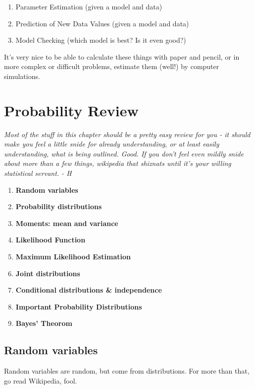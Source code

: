 \documentclass[12pt]{book}
\begin{document}
\begin{enumerate}
\item Parameter Estimation (given a model and data)
\item Prediction of New Data Values (given a model and data)
\item Model Checking (which model is best? Is it even good?)
\end{enumerate}
It's very nice to be able to calculate these things with paper and pencil, or in more complex or difficult problems, estimate them (well!) by computer simulations.






\chapter{Probability Review}

\begin{center}
\textit{Most of the stuff in this chapter should be a pretty easy review for you - it should make you feel a little snide for already understanding, or at least easily understanding, what is being outlined. Good. If you don't feel even mildly snide about more than a few things, wikipedia that shiznats until it's your willing statistical servant. - H }
\end{center}

\vspace{8 mm}

\begin{enumerate}
\item \textbf{Random variables}
\item \textbf{Probability distributions} 
\item \textbf{Moments: mean and variance} 
\item \textbf{Likelihood Function}
\item \textbf{Maximum Likelihood Estimation}
\item \textbf{Joint distributions} 
\item \textbf{Conditional distributions \& independence} 
\item \textbf{Important Probability Distributions}
\item \textbf{Bayes' Theorom}
\end{enumerate}

\vspace{8 mm}

\section{Random variables}
Random variables are random, but come from distributions. For more than that, go read Wikipedia, fool.
\\
\end{document}

